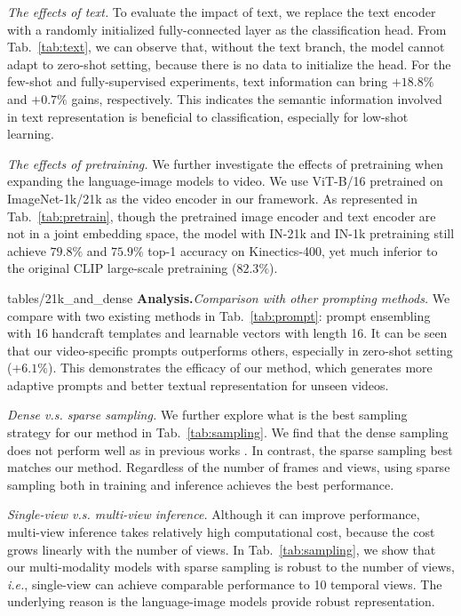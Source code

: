 \documentclass[runningheads]{llncs}
\begin{document}
\textit{The effects of text.} To evaluate the impact of text, we replace the text encoder with a randomly initialized fully-connected layer as the classification head. From Tab.~\ref{tab:text}, we can observe that, without the text branch, the model cannot adapt to zero-shot setting, because there is no data to initialize the head. For the few-shot and fully-supervised experiments, text information can bring $+18.8\%$ and $+0.7\%$ gains, respectively. This indicates the semantic information involved in text representation is beneficial to classification, especially for low-shot learning.

\textit{The effects of pretraining.} We further investigate the effects of pretraining when expanding the language-image models to video. We use ViT-B/16 pretrained on ImageNet-1k/21k as the video encoder in our framework. As represented in Tab.~\ref{tab:pretrain}, though the pretrained image encoder and text encoder are not in a joint embedding space, the model with IN-21k and IN-1k pretraining still achieve $79.8\%$ and $75.9\%$ top-1 accuracy on Kinectics-400, yet much inferior to the original CLIP large-scale pretraining ($82.3\%$).

{tables/21k_and_dense}
\noindent\textbf{Analysis.}\textit{Comparison with other prompting methods.} We compare with two existing methods in Tab.~\ref{tab:prompt}: prompt ensembling \cite{clip} with 16 handcraft templates and learnable vectors \cite{zhou2021coop} with length 16. It can be seen that our video-specific prompts outperforms others, especially in zero-shot setting ($+6.1\%$). This demonstrates the efficacy of our method, which generates more adaptive prompts and better textual representation for unseen videos. 

\textit{Dense v.s. sparse sampling.} We further explore what is the best sampling strategy for our method in Tab.~\ref{tab:sampling}. We find that the dense sampling does not perform well as in previous works \cite{liu2021video,feichtenhofer2019slowfast,arnab2021vivit}. In contrast, the sparse sampling best matches our method. Regardless of the number of frames and views, using sparse sampling both in training and inference achieves the best performance.

\textit{Single-view v.s. multi-view inference.} Although it can improve performance, multi-view inference takes relatively high computational cost, because the cost grows linearly with the number of views. In Tab.~\ref{tab:sampling}, we show that our multi-modality models with sparse sampling is robust to the number of views, \emph{i.e.}, single-view can achieve comparable performance to 10 temporal views. The underlying reason is the language-image models provide robust representation.
\end{document}

